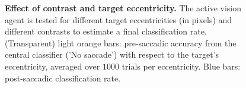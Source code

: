 \begin{figure}[t!]%
	\caption{
		{\bf Effect of contrast and target eccentricity.} %
		The active vision agent is tested for different target eccentricities (in pixels) and different contrasts to estimate a final classification rate. (Transparent) light orange bars: pre-saccadic accuracy from the central classifier ('No saccade') with respect to the target's eccentricity, averaged over $1000$ trials per eccentricity. Blue bars: post-saccadic classification rate. %
		\label{fig:results}}%
\end{figure}%
